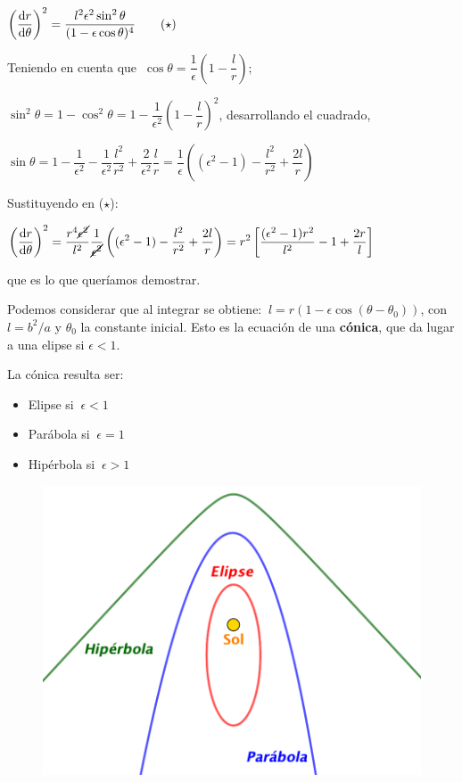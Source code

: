 $\displaystyle \left(\dv{r}{\theta} \right)^2=\dfrac{l^2 \epsilon^2 \sin^2 \theta}{(1-\epsilon \cos \theta)^4}  \qquad  (\star)$

Teniendo en cuenta que $\ \cos \theta=\dfrac 1 \epsilon \left( 1 - \dfrac l r \right); $

$\displaystyle \sin^2 \theta=1-\cos^2 \theta = 1- \dfrac 1 {\epsilon^2} \left( 1-\dfrac l r \right)^2$, desarrollando el cuadrado,

$\displaystyle \sin \theta =1-\dfrac 1 {\epsilon^2}-\dfrac 1 {\epsilon^2}\dfrac{l^2}{r^2}+\dfrac 2 {\epsilon^2} \dfrac{l}{r}=
\dfrac 1 \epsilon \left( (\epsilon^2-1)-\dfrac{l^2}{r^2}+\dfrac{2l}{r} \right) $

Sustituyendo en ($\star$):

$\displaystyle \left(\dv{r}{\theta} \right)^2=\dfrac{r^4 \cancel{\epsilon^2}}{l^2} \dfrac{1}{\cancel{\epsilon^2}}  \left( (\epsilon^2-1)-\dfrac{l^2}{r^2}+\dfrac{2l}{r} \right) = r^2 \left[ \dfrac{(\epsilon^2-1)r^2}{l^2}-1+\dfrac{2r}{l}\right] $


que es lo que queríamos demostrar.

Podemos considerar que al integrar se obtiene: $\ l=r\left( 1-\epsilon \cos (\theta-\theta_0) \right)$, con $l=b^2/a$ y $\theta_0$ la constante inicial.  Esto es la ecuación de una \textbf{cónica}, que da lugar a una elipse si $\epsilon<1$.

\begin{miparrafodestacado}
\begin{multicols}{2}
La cónica resulta ser:
\begin{itemize}
\item Elipse si $\ \epsilon < 1$	
\item Parábola si $\ \epsilon = 1$	
\item Hipérbola si $\ \epsilon > 1$	
$\quad$
\end{itemize}
\begin{figure}[H]
	\centering
	\includegraphics[width=.35\textwidth]{imagenes/imagenes15/T15IM02.png}
\end{figure}
\end{multicols}
\end{miparrafodestacado}

